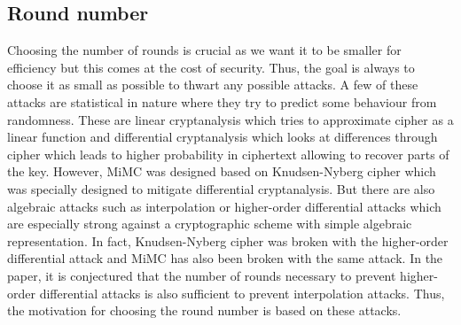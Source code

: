 \documentclass{Resources/UoBLab1}
\theoremstyle{definition}
\begin{document}
\subsection{Round number}\label{sub:roundnumber}
Choosing the number of rounds is crucial as we want it to be smaller for efficiency but this comes at the cost of security. Thus, the goal is always to choose it as small as possible to thwart any possible attacks. A few of these attacks are statistical in nature where they try to predict some behaviour from randomness. These are linear cryptanalysis\cite{DESLinear} which tries to approximate cipher as a linear function and differential cryptanalysis\cite{DESBreak} which looks at differences through cipher which leads to higher probability in ciphertext allowing to recover parts of the key. However, MiMC was designed based on Knudsen-Nyberg cipher\cite{KNCipher} which was specially designed to mitigate differential cryptanalysis. But there are also algebraic attacks such as interpolation\cite{InterpolationAttack} or higher-order differential attacks\cite{HigherOrderAttack1}\cite{HigherOrderAttack2} which are especially strong against a cryptographic scheme with simple algebraic representation. In fact, Knudsen-Nyberg cipher was broken with the higher-order differential attack\cite{InterpolationAttack} and MiMC has also been broken with the same attack\cite{MiMCAttack}. In the paper, it is conjectured that the number of rounds necessary to prevent higher-order differential attacks is also sufficient to prevent interpolation attacks. Thus, the motivation for choosing the round number is based on these attacks.\medskip
\end{document}
